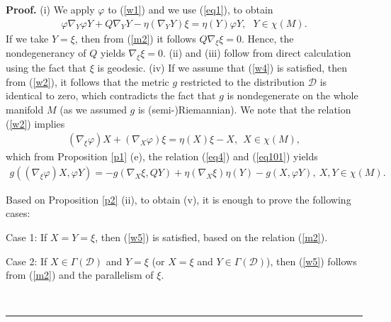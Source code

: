 \documentclass{article}
\newenvironment{proof}[1][Proof]{\noindent\textbf{#1.} }{\ \rule{0.5em}{0.5em}}
\begin{document}
\begin{proof}
(i)	We apply $\varphi$ to (\ref{w1}) and we use (\ref{eq1}), to obtain 
	\begin{eqnarray}
		\varphi\nabla_Y\varphi Y+Q\nabla_YY-\eta(\nabla_YY)\xi=\eta(Y)\varphi Y, \ \ \ Y\in\chi(M).     \nonumber
		\end{eqnarray}
	If we take $Y=\xi$, then from (\ref{m2}) it follows $Q\nabla_{\xi}\xi=0$. Hence, the nondegenerancy of $Q$ yields $\nabla_{\xi}\xi=0$. (ii) and (iii) follow from direct calculation using the fact that $\xi$ is geodesic. (iv) If we assume that (\ref{w4}) is satisfied, then from (\ref{w2}), it follows that the metric $g$ restricted to the distribution $\mathcal{D}$ is identical to zero, which contradicts the fact that $g$ is nondegenerate on the whole manifold $M$ (as we assumed $g$ is (semi-)Riemannian). We note that the relation (\ref{w2}) implies 
	\begin{eqnarray}
		(\nabla_{\xi}\varphi)X+(\nabla_X\varphi)\xi=\eta(X)\xi-X, \ \  X\in\chi(M), \label{w8}
	\end{eqnarray}
	which from Proposition \ref{p1} (e), the relation (\ref{eq4}) and (\ref{eq101}) yields
	\begin{eqnarray}
		g((\nabla_{\xi}\varphi)X,\varphi Y)=-g(\nabla_X\xi,QY)+ \eta(\nabla_X\xi)\eta(Y)-g(X,\varphi Y), \ X,Y\in\chi(M). \label{w6}
	\end{eqnarray}	
	
	Based on Proposition \ref{p2} (ii),  to obtain (v), it is enough to prove the following cases:\smallskip
	
	\noindent Case 1: If  $X=Y=\xi$, then (\ref{w5}) is satisfied, based on the relation (\ref{m2}).\smallskip
	
	\noindent Case 2: If $X\in\Gamma(\mathcal{D})$ and $Y=\xi$ (or $X=\xi$ and $Y\in\Gamma(\mathcal{D})$), then (\ref{w5}) follows from (\ref{m2}) and the parallelism of $\xi$. \smallskip
	

\end{proof}
\end{document}
